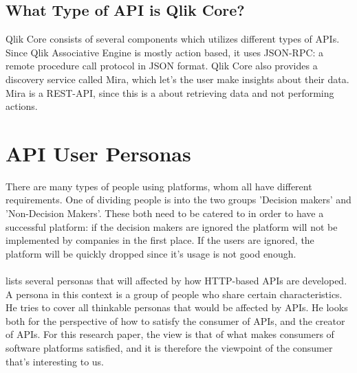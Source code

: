\documentclass{cslthse-msc}
\begin{document}
    \subsection{What Type of API is Qlik Core?}

    Qlik Core consists of several components which utilizes different types
    of APIs. Since Qlik Associative Engine is mostly action based, it uses
    JSON-RPC: a remote procedure call protocol in JSON format. Qlik Core
    also provides a discovery service called Mira, which let's the user make
    insights about their data. Mira is a REST-API, since this is a about
    retrieving data and not performing actions.\citet{qlikwebsite}

    \section{API User Personas}
    There are many types of people using platforms, whom all have different
    requirements. One of dividing people is into the two groups
    'Decision makers' and 'Non-Decision Makers'. These both need to be catered to in order
    to have a successful platform: if the decision makers are ignored the
    platform will not be implemented by companies in the first place. If the
    users are ignored, the platform will be quickly dropped since it's usage
    is not good enough.
    \\ \\
    \citet{personas} lists several personas that will affected by how HTTP-based APIs are developed. A persona in this context is a group of people who share certain characteristics. He tries to cover all thinkable personas that would be affected by APIs. He looks both for the perspective of how to satisfy the consumer of APIs, and the creator of APIs. For this research paper, the view is that of what makes consumers of software platforms satisfied, and it is therefore the viewpoint of the consumer that's interesting to us.
\end{document}
